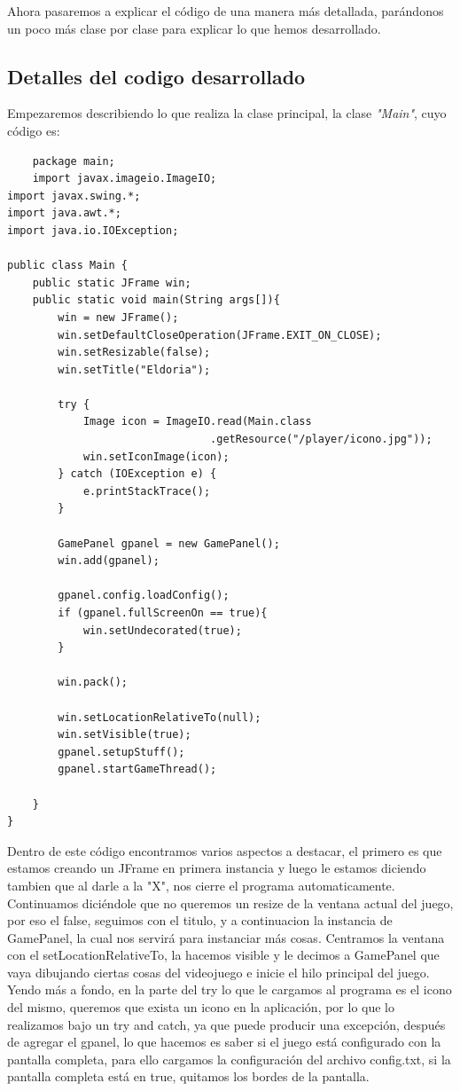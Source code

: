 \documentclass[a4paper]{article}
\begin{document}
\clearpage
Ahora pasaremos a explicar el código de una manera más detallada, parándonos un poco más clase por clase para explicar lo que hemos desarrollado.
\subsection{Detalles del codigo desarrollado}
Empezaremos describiendo lo que realiza la clase principal, la clase \textit{"Main"}, cuyo código es:
\begin{lstlisting}
    package main;
    import javax.imageio.ImageIO;
import javax.swing.*;
import java.awt.*;
import java.io.IOException;

public class Main {
    public static JFrame win;
    public static void main(String args[]){
        win = new JFrame();
        win.setDefaultCloseOperation(JFrame.EXIT_ON_CLOSE);
        win.setResizable(false);
        win.setTitle("Eldoria");

        try {
            Image icon = ImageIO.read(Main.class
                                .getResource("/player/icono.jpg"));
            win.setIconImage(icon);
        } catch (IOException e) {
            e.printStackTrace();
        }

        GamePanel gpanel = new GamePanel();
        win.add(gpanel);

        gpanel.config.loadConfig();
        if (gpanel.fullScreenOn == true){
            win.setUndecorated(true);
        }

        win.pack();

        win.setLocationRelativeTo(null);
        win.setVisible(true);
        gpanel.setupStuff();
        gpanel.startGameThread();

    }
}
\end{lstlisting}
Dentro de este código encontramos varios aspectos a destacar, el primero es que estamos creando un JFrame en primera instancia y luego le estamos diciendo tambien que al darle a la "X", nos cierre el programa automaticamente.
Continuamos diciéndole que no queremos un resize de la ventana actual del juego, por eso el false, seguimos con el titulo, y a continuacion la instancia de GamePanel, la cual nos servirá para instanciar más cosas.
Centramos la ventana con el setLocationRelativeTo, la hacemos visible y le decimos a GamePanel que vaya dibujando ciertas cosas del videojuego e inicie el hilo principal del juego.\\

Yendo más a fondo, en la parte del try lo que le cargamos al programa es el icono del mismo, queremos que exista un icono en la aplicación, por lo que lo realizamos bajo un try and catch, ya que puede producir una excepción,
después de agregar el gpanel, lo que hacemos es saber si el juego está configurado con la pantalla completa, para ello cargamos la configuración del archivo config.txt, si la pantalla completa está en true, quitamos los bordes de la pantalla.\\
\end{document}
